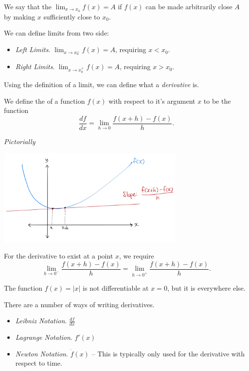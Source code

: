 \documentclass[a4]{scrartcl}
\begin{document}
\begin{definition}[Limits]
	We say that the  $\lim_{x \to x_0} f(x) = A$ if $f(x)$ can be made arbitrarily close $A$ by making $x$ sufficiently close to $x_0$.
\end{definition}

We can define limits from two side:
\begin{itemize}
	\item \emph{Left Limits}. $\lim_{x \to x_0^-} f(x) = A$, requiring $x < x_0$.
	\item \emph{Right Limits}. $\lim_{x \to x_0^+} f(x) = A$, requiring $x > x_0$.
\end{itemize}

Using the definition of a limit, we can define what a \emph{derivative} is.

\begin{definition}[Derivatives]
	We define the  of a function $f(x)$ with respect to it's argument $x$ to be the function
	$$
	\frac{df}{dx} = \lim_{h \to 0} \frac{f(x + h) - f(x)}{h}.
	$$
\end{definition}

\emph{Pictorially}

\begin{center}
	\includegraphics[width=0.7\textwidth]{derivative.jpg}
\end{center}

For the derivative to exist at a point $x$, we require
$$
\lim_{h \to 0^-} \frac{f(x + h) - f(x)}{h} = \lim_{h \to 0^+} \frac{f(x + h) - f(x)}{h}.
$$

\begin{example}
	The function $f(x) = |x|$ is not differentiable at $x = 0$, but it is everywhere else.
\end{example}

There are a number of ways of writing derivatives.
\begin{itemize}
	\item \emph{Leibniz Notation}. $\frac{df}{dx}$
	\item \emph{Lagrange Notation}. $f'(x)$
	\item \emph{Newton Notation}. $\dot{f}(x)$ -- This is typically only used for the derivative with respect to time.
\end{itemize}
\end{document}
